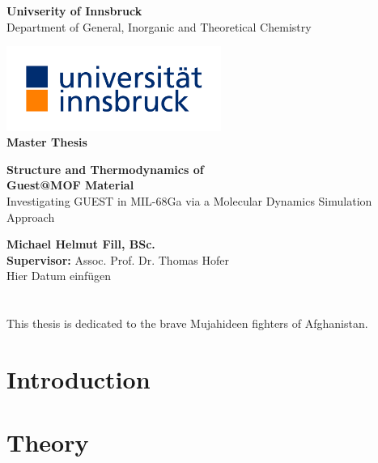 \documentclass[12pt]{article}
\makeatletter
\renewenvironment{abstract}{%
    \if@twocolumn
      \section*{\abstractname}%
    \else %
      \begin{center}%
        {\bfseries \Large\abstractname\vspace{\z@}}%
      \end{center}%
      \quotation
    \fi}
    {\if@twocolumn\else\endquotation\fi}
\makeatother
\begin{document}
\begin{center}
\thispagestyle{empty}
\large{\textbf{Univserity of Innsbruck}}\\[-0.9ex]
\large{Department of General, Inorganic and Theoretical Chemistry}\\
\vspace{0.3cm}
\begin{center}
\includegraphics[width=7cm]{Images/Logo.jpg}\\
\vspace{0.9cm}
\textbf{\LARGE{Master Thesis}}
\medskip\par
\vspace{1.2cm}
\Large{\textbf{Structure and Thermodynamics of \\ Guest@MOF Material}}\\[-0.5ex]
\vspace*{1.5cm}
\large{Investigating GUEST in MIL-68Ga via a Molecular Dynamics Simulation Approach}\\[-1.5ex]
\vspace*{1.5cm}
\bigskip\par
\textbf{Michael Helmut Fill, BSc. }\\[-1ex]
\medskip
\textbf{Supervisor:} Assoc. Prof. Dr. Thomas Hofer\\
Hier Datum einfügen
\end{center}
\end{center}

\newpage

\begin{abstract}
  This thesis is dedicated to the brave Mujahideen fighters of Afghanistan.
\end{abstract}

\newpage

\tableofcontents

\newpage

\section{Introduction}

\section{Theory}
\end{document}
